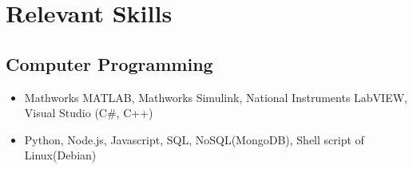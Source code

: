 \section*{Relevant Skills}
\subsection*{Computer Programming}
\begin{itemize}
  \item[] Mathworks MATLAB, Mathworks Simulink, National Instruments LabVIEW, Visual Studio (C\#, C++)
  \item[] Python, Node.js, Javascript, SQL, NoSQL(MongoDB), Shell script of Linux(Debian)
\end{itemize}

